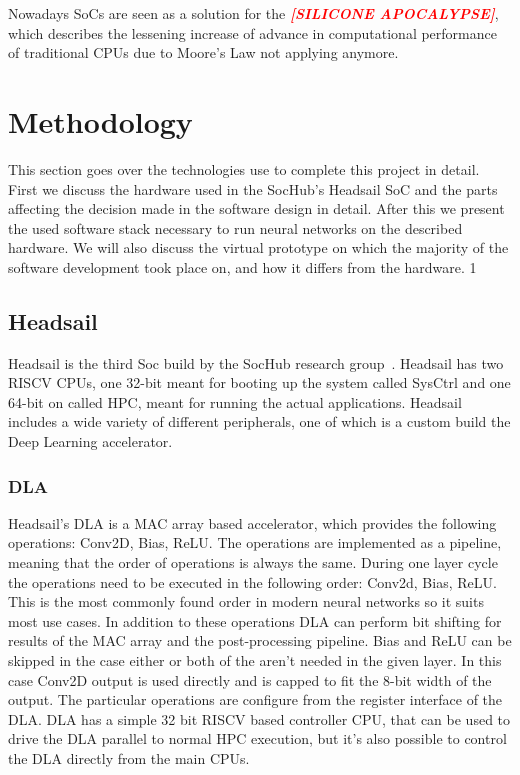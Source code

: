 \documentclass[12pt,a4paper,english
]{tunithesis}
\newcommand{\fixthis}[1]{\textbf{\textit{\textcolor{red}{[#1]}}}}
\begin{document}
Nowadays SoCs are seen as a solution for the \fixthis{SILICONE APOCALYPSE}, which describes the lessening increase of advance in computational performance of traditional CPUs due to Moore's Law not applying anymore.

\chapter{Methodology}
This section goes over the technologies use to complete this project in detail. First we discuss the hardware used in the SocHub's Headsail SoC and the parts affecting the decision made in the software design in detail. After this we present the used software stack necessary to run neural networks on the described hardware. We will also discuss the virtual prototype on which the majority of the software development took place on, and how it differs from the hardware.   1
\label{ch:methodology}

\section{Headsail}
Headsail is the third Soc build by the SocHub research group~\parencite{Ballast}. Headsail has two RISCV CPUs, one 32-bit meant for booting up the system called SysCtrl and one 64-bit on called HPC, meant for running the actual applications.
Headsail includes a wide variety of different peripherals, one of which is a custom build the Deep Learning accelerator.

\subsection{DLA}
Headsail's DLA is a MAC array based accelerator, which provides the following operations: Conv2D, Bias, ReLU. The operations are implemented as a pipeline, meaning that the order of operations is always the same. During one layer cycle the operations need to be executed in the following order: Conv2d, Bias, ReLU. This is the most commonly found order in modern neural networks so it suits most use cases. In addition to these operations DLA can perform bit shifting for results of the MAC array and the post-processing pipeline.
Bias and ReLU can be skipped in the case either or both of the aren't needed in the given layer. In this case Conv2D output is used directly and is capped to fit the 8-bit width of the output.
The particular operations are configure from the register interface of the DLA.
DLA has a simple 32 bit RISCV based controller CPU, that can be used to drive the DLA parallel to normal HPC execution, but it's also possible to control the DLA directly from the main CPUs.
\end{document}
